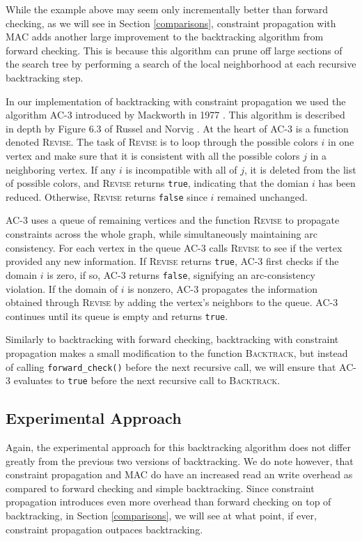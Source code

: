 \documentclass{article}
\begin{document}
		While the example above may seem only incrementally better than forward checking, as we will see in Section \ref{comparisons}, constraint propagation with MAC adds another large improvement to the backtracking algorithm from forward checking. This is because this algorithm can prune off large sections of the search tree by performing a search of the local neighborhood at each recursive backtracking step.
		
		In our implementation of backtracking with constraint propagation we used the algorithm AC-3 introduced by Mackworth in 1977 \cite{mackworth}. This algorithm is described in depth by Figure 6.3 of Russel and Norvig \cite{ai}.  At the heart of AC-3 is a function denoted \textsc{Revise}. The task of \textsc{Revise} is to loop through the possible colors $i$ in one vertex and make sure that it is consistent with all the possible colors $j$ in a neighboring vertex. If any $i$ is incompatible with all of $j$, it is deleted from the list of possible colors, and \textsc{Revise} returns \texttt{true}, indicating that the domian $i$ has been reduced. Otherwise, \textsc{Revise} returns \texttt{false} since $i$ remained unchanged.
		
		AC-3 uses a queue of remaining vertices and the function \textsc{Revise} to propagate constraints across the whole graph, while simultaneously maintaining arc consistency. For each vertex in the queue AC-3 calls \textsc{Revise} to see if the vertex provided any new information. If \textsc{Revise} returns \texttt{true}, AC-3 first checks if the domain $i$ is zero, if so, AC-3 returns \texttt{false}, signifying an arc-consistency violation. If the domain of $i$ is nonzero, AC-3 propagates the information obtained through \textsc{Revise} by adding the vertex's neighbors to the queue. AC-3 continues until its queue is empty and returns \texttt{true}.
		
		Similarly to backtracking with forward checking, backtracking with constraint propagation makes a small modification to the function \textsc{Backtrack}, but instead of calling \texttt{forward\_check()} before the next recursive call, we will ensure that AC-3 evaluates to \texttt{true} before the next recursive call to \textsc{Backtrack}.
	\subsection{Experimental Approach}
	
		Again, the experimental approach for this backtracking algorithm does not differ greatly from the previous two versions of backtracking. We do note however, that constraint propagation and MAC do have an increased read an write overhead as compared to forward checking and simple backtracking. Since constraint propagation introduces even more overhead than forward checking on top of backtracking, in Section \ref{comparisons}, we will see at what point, if ever, constraint propagation outpaces backtracking.
	
\end{document}
